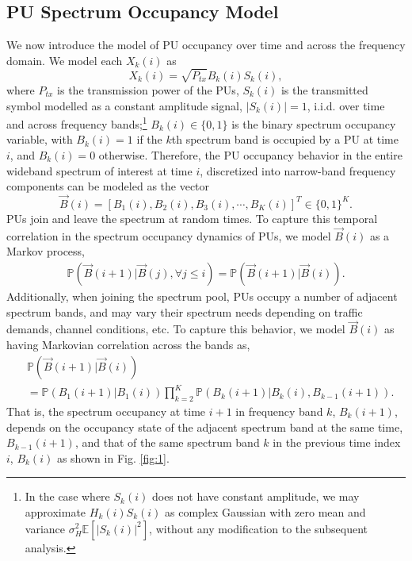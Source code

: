 \documentclass[10pt,twocolumn]{IEEEtran}
\begin{document}
\subsection{PU Spectrum Occupancy Model}
We now introduce the model of PU occupancy over time and across the frequency domain. We model each $X_k(i)$ as 
\begin{equation}\label{4}
    X_k(i) = \sqrt{P_{tx}}B_k(i)S_k(i),
\end{equation}
where $P_{tx}$ is the transmission power of the PUs, $S_k(i)$ is the transmitted symbol modelled as a constant amplitude signal, $|S_k(i)|{=}1$, i.i.d. over time and across frequency bands;\footnote{In the case where $S_k(i)$ does not have constant amplitude, we may approximate $H_{k}(i)S_{k}(i)$ as complex Gaussian with zero mean and variance $\sigma_H^2\mathbb E[|S_{k}(i)|^2]$, without any modification to the subsequent analysis.} $B_k(i){\in}\{0,1\}$ is the binary spectrum occupancy variable, with $B_k(i){=}1$ if the $k$th spectrum band is occupied by a PU at time $i$, and $B_k(i){=}0$ otherwise. Therefore, the PU occupancy behavior in the entire wideband spectrum of interest at time $i$, discretized into narrow-band frequency components can be modeled as the vector 
\begin{equation}\label{5}
    \vec{B}(i) = [B_1(i), B_2(i), B_3(i), \cdots, B_K(i)]^T \in \{0, 1\}^K.
\end{equation}
PUs join and leave the spectrum at random times. To capture this temporal correlation in the spectrum occupancy dynamics of PUs, we model $\vec{B}(i)$ as a Markov process,
\begin{equation}\label{6}
    \begin{aligned}
        \mathbb{P}(\vec{B}(i+1)|\vec{B}(j), \forall j \leq i) = \mathbb{P}(\vec{B}(i+1)|\vec{B}(i)).
    \end{aligned}
\end{equation}
Additionally, when joining the spectrum pool, PUs occupy a number of adjacent spectrum bands, and may vary their spectrum needs depending on traffic demands, channel conditions, etc. To capture this behavior, we model $\vec{B}(i)$ as having Markovian correlation across the bands as, 
\begin{align}\label{7}
&         \mathbb{P}(\vec{B}(i+1)|\vec{B}(i))\\&=
\nonumber
         \mathbb{P}(B_{1}(i+1)|B_{1}(i))
         \prod_{k=2}^{K} \mathbb{P}(B_{k}(i+1)|B_{k}(i), B_{k-1}(i+1)).
\end{align}
That is, the spectrum occupancy at time $i+1$ in frequency band $k$, $B_{k}(i+1)$, depends on the  occupancy state of the adjacent spectrum band at the same time, $B_{k-1}(i+1)$, and that of the same spectrum band $k$ in the previous time index $i$, $B_{k}(i)$ as shown in Fig. \ref{fig:1}.
\end{document}
